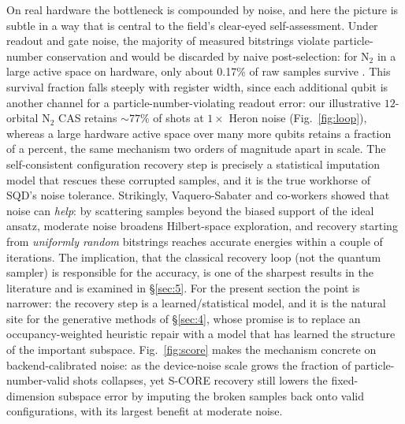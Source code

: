 \documentclass[11pt]{article}
\begin{document}
On real hardware the bottleneck is compounded by noise, and here the picture is subtle in a way that is central to the field's clear-eyed self-assessment. Under readout and gate noise, the majority of measured bitstrings violate particle-number conservation and would be discarded by naive post-selection: for N$_2$ in a large active space on hardware, only about 0.17\% of raw samples survive \cite{vaquerosabater2026}. This survival fraction falls steeply with register width, since each additional qubit is another channel for a particle-number-violating readout error: our illustrative $12$-orbital N$_2$ CAS retains ${\sim}77\%$ of shots at $1\times$ Heron noise (Fig.~\ref{fig:loop}), whereas a large hardware active space over many more qubits retains a fraction of a percent, the same mechanism two orders of magnitude apart in scale. The self-consistent configuration recovery step is precisely a statistical imputation model that rescues these corrupted samples, and it is the true workhorse of SQD's noise tolerance. Strikingly, Vaquero-Sabater and co-workers showed that noise can \emph{help}: by scattering samples beyond the biased support of the ideal ansatz, moderate noise broadens Hilbert-space exploration, and recovery starting from \emph{uniformly random} bitstrings reaches accurate energies within a couple of iterations. The implication, that the classical recovery loop (not the quantum sampler) is responsible for the accuracy, is one of the sharpest results in the literature and is examined in \S\ref{sec:5}. For the present section the point is narrower: the recovery step is a learned/statistical model, and it is the natural site for the generative methods of \S\ref{sec:4}, whose promise is to replace an occupancy-weighted heuristic repair with a model that has learned the structure of the important subspace. Fig.~\ref{fig:score} makes the mechanism concrete on backend-calibrated noise: as the device-noise scale grows the fraction of particle-number-valid shots collapses, yet S-CORE recovery still lowers the fixed-dimension subspace error by imputing the broken samples back onto valid configurations, with its largest benefit at moderate noise.
\end{document}
